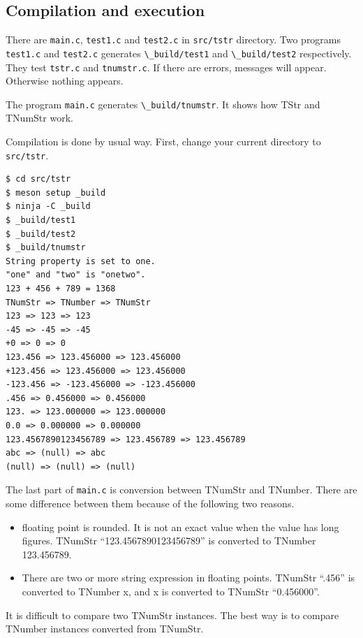 \subsection{Compilation and execution}\label{compilation-and-execution}

There are \passthrough{\lstinline!main.c!},
\passthrough{\lstinline!test1.c!} and \passthrough{\lstinline!test2.c!}
in \passthrough{\lstinline!src/tstr!} directory. Two programs
\passthrough{\lstinline!test1.c!} and \passthrough{\lstinline!test2.c!}
generates \passthrough{\lstinline!\_build/test1!} and
\passthrough{\lstinline!\_build/test2!} respectively. They test
\passthrough{\lstinline!tstr.c!} and
\passthrough{\lstinline!tnumstr.c!}. If there are errors, messages will
appear. Otherwise nothing appears.

The program \passthrough{\lstinline!main.c!} generates
\passthrough{\lstinline!\_build/tnumstr!}. It shows how TStr and TNumStr
work.

Compilation is done by usual way. First, change your current directory
to \passthrough{\lstinline!src/tstr!}.

\begin{lstlisting}
$ cd src/tstr
$ meson setup _build
$ ninja -C _build
$ _build/test1
$ _build/test2
$ _build/tnumstr
String property is set to one.
"one" and "two" is "onetwo".
123 + 456 + 789 = 1368
TNumStr => TNumber => TNumStr
123 => 123 => 123
-45 => -45 => -45
+0 => 0 => 0
123.456 => 123.456000 => 123.456000
+123.456 => 123.456000 => 123.456000
-123.456 => -123.456000 => -123.456000
.456 => 0.456000 => 0.456000
123. => 123.000000 => 123.000000
0.0 => 0.000000 => 0.000000
123.4567890123456789 => 123.456789 => 123.456789
abc => (null) => abc
(null) => (null) => (null)
\end{lstlisting}

The last part of \passthrough{\lstinline!main.c!} is conversion between
TNumStr and TNumber. There are some difference between them because of
the following two reasons.

\begin{itemize}
\tightlist
\item
  floating point is rounded. It is not an exact value when the value has
  long figures. TNumStr ``123.4567890123456789'' is converted to TNumber
  123.456789.
\item
  There are two or more string expression in floating points. TNumStr
  ``.456'' is converted to TNumber x, and x is converted to TNumStr
  ``0.456000''.
\end{itemize}

It is difficult to compare two TNumStr instances. The best way is to
compare TNumber instances converted from TNumStr.

